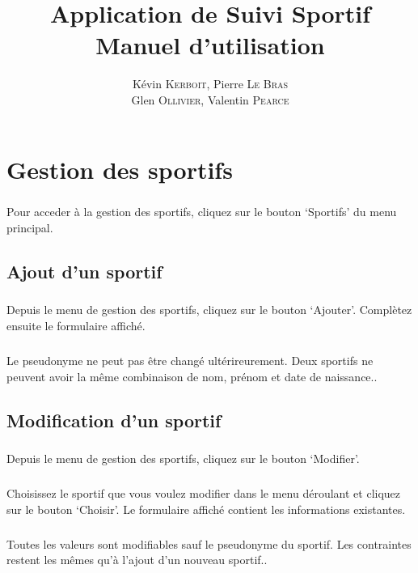 \documentclass[french,12pt,a4paper,openany]{book}
\author{Kévin \textsc{Kerboit}, Pierre \textsc{Le Bras}\\Glen \textsc{Ollivier}, Valentin \textsc{Pearce}}
\date{}
\begin{document}
\title{Application de Suivi Sportif \\ Manuel d'utilisation}
\maketitle
\tableofcontents
\chapter{Gestion des sportifs}
\paragraph{}{Pour acceder à la gestion des sportifs, cliquez sur le bouton `Sportifs' du menu principal.}
\section{Ajout d'un sportif}
\paragraph{}{Depuis le menu de gestion des sportifs, cliquez sur le bouton `Ajouter'. Complètez ensuite le formulaire affiché.}
\paragraph{}{Le pseudonyme ne peut pas être changé ultérireurement. Deux sportifs ne peuvent avoir la même combinaison de nom, prénom et date de naissance.}.
\section{Modification d'un sportif}
\paragraph{}{Depuis le menu de gestion des sportifs, cliquez sur le bouton `Modifier'.}
\paragraph{}{Choisissez le sportif que vous voulez modifier dans le menu déroulant et cliquez sur le bouton `Choisir'. Le formulaire affiché contient les informations existantes.}
\paragraph{}{Toutes les valeurs sont modifiables sauf le pseudonyme du sportif. Les contraintes restent les mêmes qu'à l'ajout d'un nouveau sportif.}.
\end{document}
